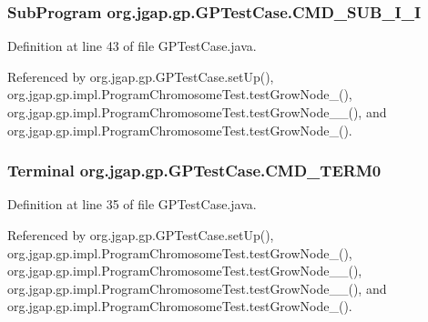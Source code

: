\hypertarget{classorg_1_1jgap_1_1gp_1_1_g_p_test_case_a61b6e3722a9804036ba913c8a717d1d9}{
\subsubsection[{C\-M\-D\-\_\-\-S\-U\-B\-\_\-\-I\-\_\-\-I}]{\setlength{\rightskip}{0pt plus 5cm}Sub\-Program org.\-jgap.\-gp.\-G\-P\-Test\-Case.\-C\-M\-D\-\_\-\-S\-U\-B\-\_\-\-I\-\_\-\-I\hspace{0.3cm}{\ttfamily [protected]}}}\label{classorg_1_1jgap_1_1gp_1_1_g_p_test_case_a61b6e3722a9804036ba913c8a717d1d9}


Definition at line 43 of file G\-P\-Test\-Case.\-java.



Referenced by org.\-jgap.\-gp.\-G\-P\-Test\-Case.\-set\-Up(), org.\-jgap.\-gp.\-impl.\-Program\-Chromosome\-Test.\-test\-Grow\-Node\-\_(), org.\-jgap.\-gp.\-impl.\-Program\-Chromosome\-Test.\-test\-Grow\-Node\-\_\-\_(), and org.\-jgap.\-gp.\-impl.\-Program\-Chromosome\-Test.\-test\-Grow\-Node\-\_().

\hypertarget{classorg_1_1jgap_1_1gp_1_1_g_p_test_case_abf3465628e8f1fb05af5309c3e54be0f}{
\subsubsection[{C\-M\-D\-\_\-\-T\-E\-R\-M0}]{\setlength{\rightskip}{0pt plus 5cm}Terminal org.\-jgap.\-gp.\-G\-P\-Test\-Case.\-C\-M\-D\-\_\-\-T\-E\-R\-M0\hspace{0.3cm}{\ttfamily [protected]}}}\label{classorg_1_1jgap_1_1gp_1_1_g_p_test_case_abf3465628e8f1fb05af5309c3e54be0f}


Definition at line 35 of file G\-P\-Test\-Case.\-java.



Referenced by org.\-jgap.\-gp.\-G\-P\-Test\-Case.\-set\-Up(), org.\-jgap.\-gp.\-impl.\-Program\-Chromosome\-Test.\-test\-Grow\-Node\-\_(), org.\-jgap.\-gp.\-impl.\-Program\-Chromosome\-Test.\-test\-Grow\-Node\-\_\-\_(), org.\-jgap.\-gp.\-impl.\-Program\-Chromosome\-Test.\-test\-Grow\-Node\-\_\-\_(), and org.\-jgap.\-gp.\-impl.\-Program\-Chromosome\-Test.\-test\-Grow\-Node\-\_().

